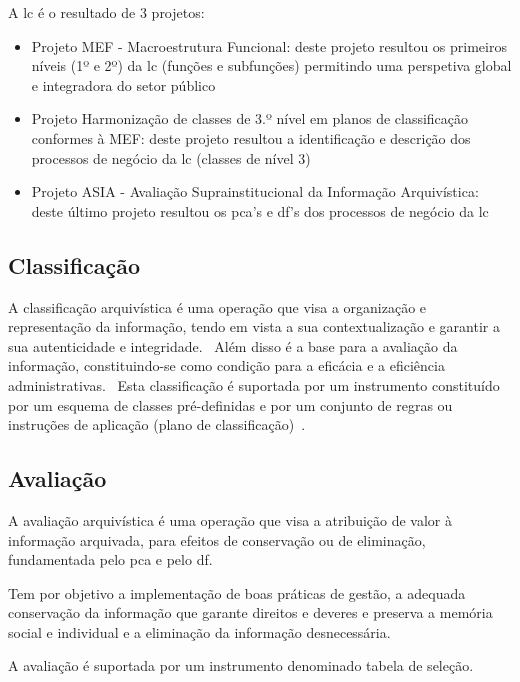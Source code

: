 A \acrshort{lc} é o resultado de 3 projetos:
\begin{itemize}
    \item Projeto MEF - Macroestrutura Funcional: deste projeto resultou os primeiros níveis (1º e 2º) da \acrshort{lc} (funções e subfunções) permitindo uma perspetiva global e integradora do setor público
    \item Projeto Harmonização de classes de 3.º nível em planos de classificação conformes à MEF: deste projeto resultou a identificação e descrição dos processos de negócio da \acrshort{lc} (classes de nível 3)
    \item Projeto ASIA - Avaliação Suprainstitucional da Informação Arquivística: deste último projeto resultou os \acrshort{pca}'s e \acrshort{df}'s dos processos de negócio da \acrshort{lc} 
\end{itemize}

\subsection{Classificação}

A classificação arquivística é uma operação que visa a organização e representação da informação, tendo em vista a sua contextualização e garantir a sua autenticidade e integridade.~\cite{clavClass} Além disso é a base para a avaliação da informação, constituindo-se como condição para a eficácia e a eficiência administrativas.~\cite{clavClass} Esta classificação é suportada por um instrumento constituído por um esquema de classes pré-definidas e por um conjunto de regras ou instruções de aplicação (plano de classificação)~\cite{clavClass}.

\subsection{Avaliação}

A avaliação arquivística é uma operação que visa a atribuição de valor à informação arquivada, para efeitos de conservação ou de eliminação, fundamentada pelo \acrshort{pca} e pelo \acrshort{df}.~\cite{clavClass}

Tem por objetivo a implementação de boas práticas de gestão, a adequada conservação da informação que garante direitos e deveres e preserva a memória social e individual e a eliminação da informação desnecessária.~\cite{clavClass}

A avaliação é suportada por um instrumento denominado tabela de seleção.

